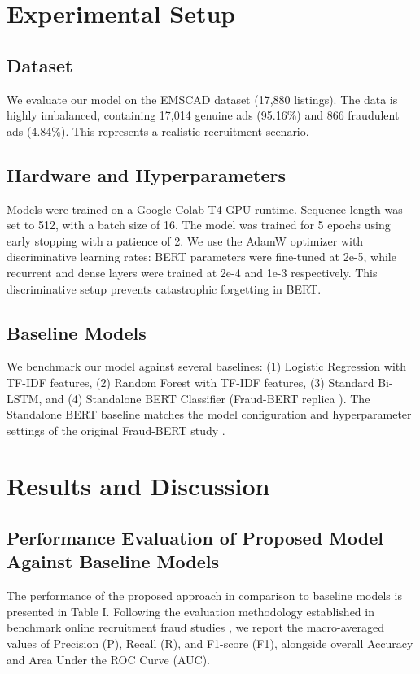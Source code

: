 \documentclass[conference]{IEEEtran}
\begin{document}
\section{Experimental Setup}

\subsection{Dataset}
We evaluate our model on the EMSCAD dataset (17,880 listings). The data is highly imbalanced, containing 17,014 genuine ads (95.16\%) and 866 fraudulent ads (4.84\%). This represents a realistic recruitment scenario.

\subsection{Hardware and Hyperparameters}
Models were trained on a Google Colab T4 GPU runtime. Sequence length was set to 512, with a batch size of 16. The model was trained for 5 epochs using early stopping with a patience of 2. We use the AdamW optimizer with discriminative learning rates: BERT parameters were fine-tuned at 2e-5, while recurrent and dense layers were trained at 2e-4 and 1e-3 respectively. This discriminative setup prevents catastrophic forgetting in BERT.

\subsection{Baseline Models}
We benchmark our model against several baselines: (1) Logistic Regression with TF-IDF features, (2) Random Forest with TF-IDF features, (3) Standard Bi-LSTM, and (4) Standalone BERT Classifier (Fraud-BERT replica \cite{taneja2025fraud}). The Standalone BERT baseline matches the model configuration and hyperparameter settings of the original Fraud-BERT study \cite{taneja2025fraud}.

\section{Results and Discussion}

\subsection{Performance Evaluation of Proposed Model Against Baseline Models}
The performance of the proposed approach in comparison to baseline models is presented in Table I. Following the evaluation methodology established in benchmark online recruitment fraud studies \cite{taneja2025fraud}, we report the macro-averaged values of Precision (P), Recall (R), and F1-score (F1), alongside overall Accuracy and Area Under the ROC Curve (AUC).
\end{document}
